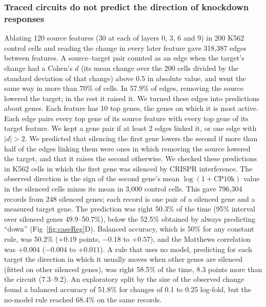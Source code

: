 \documentclass[10pt,letterpaper]{article}
\begin{document}
\subsubsection*{Traced circuits do not predict the direction of knockdown responses}
Ablating 120 source features (30 at each of layers 0, 3, 6 and 9) in 200
K562 control cells and reading the change in every later feature gave
318,387 edges between features. A source--target pair counted as an
edge when the target's change had a Cohen's $d$ (its mean change over the
200 cells divided by the standard deviation of that change) above 0.5 in
absolute value, and went the same way in more than 70\% of cells. In
57.9\% of edges, removing the source lowered the target; in the rest it
raised it. We turned these edges into predictions about genes. Each
feature has 10 top genes, the genes on which it is most active. Each edge
pairs every top gene of its source feature with every top gene of its
target feature. We kept a gene pair if at least 2 edges linked it, or one
edge with $|d| > 2$. We predicted that silencing the first gene lowers the
second if more than half of the edges linking them were ones in which
removing the source lowered the target, and that it raises the second
otherwise. We checked these predictions in K562 cells in which the first
gene was silenced by CRISPR interference. The observed direction is the
sign of the second gene's mean $\log(1+\text{CP10k})$ value in the
silenced cells minus its mean in 3,000 control cells. This gave 796,304
records from 248 silenced genes; each record is one pair of a silenced
gene and a measured target gene. The prediction was right
50.3\% of the time (95\% interval over silenced genes 49.9--50.7\%),
below the 52.5\% obtained by always predicting ``down''
(Fig~\ref{fig:caseReg}D). Balanced accuracy, which is 50\% for any
constant rule, was 50.2\% ($+0.19$ points, $-0.18$ to $+0.57$), and the
Matthews correlation was $+0.004$ ($-0.004$ to $+0.011$). A rule that
uses no model, predicting for each target the direction in which it
usually moves when other genes are silenced (fitted on other silenced
genes), was right 58.5\% of the time, 8.3 points more than the circuit
(7.3--9.2). An exploratory split by the size of the observed change found
a balanced accuracy of 51.8\% for changes of 0.1 to 0.25 log-fold, but the
no-model rule reached 68.4\% on the same records.
\end{document}
